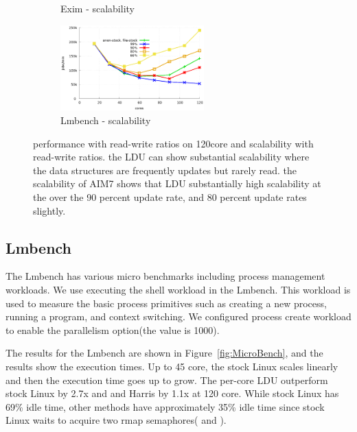 \begin{figure}[t!]
\begin{subfigure}[b]{0.33\textwidth}
        \caption{Exim - scalability}
    \end{subfigure}
    \begin{subfigure}[b]{0.33\textwidth}
        \includegraphics[height=1.3in]{graph/ratio_lmbench_core.eps}
        \caption{Lmbench - scalability}
    \end{subfigure}
    \caption{performance with read-write ratios on 120core and scalability with
    read-write ratios. the LDU can show substantial scalability where the data
    structures are frequently updates but rarely read. the scalability of AIM7
    shows that LDU substantially high scalability at the over the 90 percent
    update rate, and 80 percent update rates slightly.}
    
\end{figure}

\subsection{Lmbench}
The Lmbench has various micro benchmarks including process management workloads.
We use executing the shell workload in the Lmbench.
This workload is used to measure the basic process primitives such as creating a
new process, running a program, and context switching.
We configured process create workload to enable the parallelism option(the
value is 1000).

The results for the Lmbench are shown in Figure~\ref{fig:MicroBench}, 
and the results show the execution times.
Up to 45 core, the stock Linux scales linearly and then the execution time goes
up to grow.
The per-core LDU outperform stock Linux by 2.7x and and Harris by
1.1x at 120 core.
While stock Linux has 69\% idle time, other methods have approximately 35\%
idle time since stock Linux waits to acquire two rmap
semaphores( and ).

